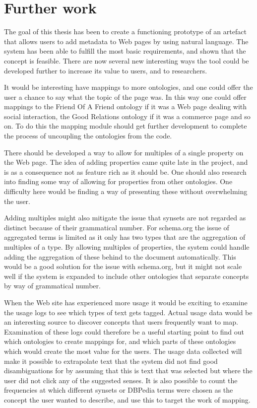 \section{Further work}
The goal of this thesis has been to create a functioning prototype of an artefact that allows users to add metadata
to Web pages by using natural language.
The system has been able to fulfill the most basic requirements, and shown that the concept is feasible.
There are now several new interesting ways the tool could be developed further to increase its value to users,
and to researchers.

It would be interesting have mappings to more ontologies,
and one could offer the user a chance to say what the topic of the page was.
In this way one could offer mappings to the Friend Of A Friend ontology if it was a Web page dealing with
social interaction, the Good Relations ontology if it was a commerce page and so on.
To do this the mapping module should get further development to complete the process of uncoupling the ontologies
from the code.

There should be developed a way to allow for multiples of a single property on the Web page.
The idea of adding properties came quite late in the project,
and is as a consequence not as feature rich as it should be.
One should also research into finding some way of allowing for properties from other ontologies.
One difficulty here would be finding a way of presenting these without overwhelming the user.

Adding multiples might also mitigate the issue that synsets are not regarded as distinct because of their grammatical number.
For schema.org the issue of aggregated terms is limited as it only has two types that are the aggregation of multiples of a type.
By allowing multiples of properties, the system could handle adding the aggregation of these behind to the document automatically.
This would be a good solution for the issue with schema.org,
but it might not scale well if the system is expanded to include other ontologies that separate concepts by way of grammatical number.

When the Web site has experienced more usage it would be exciting to examine the usage logs to see which types of text gets tagged.
Actual usage data would be an interesting source to discover concepts that users frequently want to map.
Examination of these logs could therefore be a useful starting point to find out which ontologies to create mappings for,
and which parts of these ontologies which would create the most value for the users.
The usage data collected will make it possible to extrapolate text that the system did not find good disambiguations for
by assuming that this is text that was selected but where the user did not click any of the suggested senses.
It is also possible to count the frequencies at which different synsets or DBPedia terms were chosen as the concept the
user wanted to describe, and use this to target the work of mapping.

